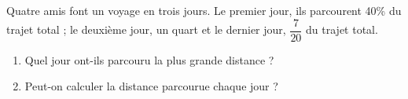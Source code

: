
\begin{exercice}\label{exo2smath-0025}

    Quatre amis font un voyage en trois jours. Le premier jour, ils parcourent 40\% du trajet total ; le deuxième jour, un quart et le dernier jour, \( \dfrac{ 7 }{ 20 }\) du trajet total. 

    \begin{enumerate}
        \item
 Quel jour ont-ils parcouru la plus grande distance ?
\item
Peut-on calculer la distance parcourue chaque jour ?
    \end{enumerate}

\end{exercice}
